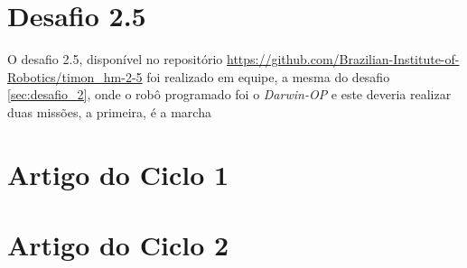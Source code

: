 \section{Desafio 2.5}
\label{sec:desafio_2_5}
O desafio 2.5, disponível no repositório \url{https://github.com/Brazilian-Institute-of-Robotics/timon_hm-2-5} foi realizado em equipe, a mesma do desafio \ref{sec:desafio_2}, onde o robô programado foi o \textit{Darwin-OP} e este deveria realizar duas missões, a primeira, é a marcha  


\section{Artigo do Ciclo 1}
\label{sec:artigo_ciclo1}


\section{Artigo do Ciclo 2}
\label{sec:artigo_ciclo2}